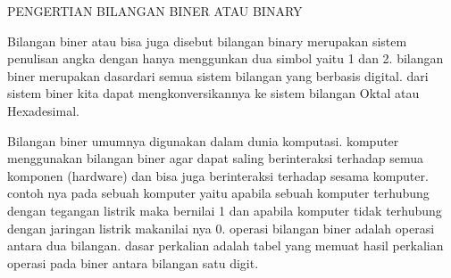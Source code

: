 PENGERTIAN BILANGAN BINER ATAU BINARY

Bilangan biner atau bisa juga disebut bilangan binary merupakan sistem penulisan angka dengan hanya menggunkan dua simbol yaitu 1 dan 2. bilangan biner merupakan dasardari semua sistem bilangan yang berbasis digital. dari sistem biner kita dapat mengkonversikannya ke sistem bilangan Oktal atau Hexadesimal.

Bilangan biner umumnya digunakan dalam dunia komputasi. komputer menggunakan bilangan biner agar dapat saling berinteraksi terhadap semua komponen (hardware) dan bisa juga berinteraksi terhadap sesama komputer. contoh nya pada sebuah komputer yaitu apabila sebuah komputer terhubung dengan tegangan listrik maka bernilai 1 dan apabila komputer tidak terhubung dengan jaringan listrik makanilai nya 0.
operasi bilangan biner  adalah operasi antara dua bilangan. dasar perkalian adalah tabel yang memuat hasil perkalian operasi pada biner antara bilangan satu digit.
